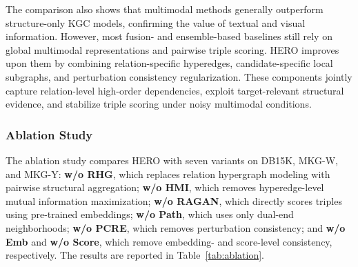 \documentclass[pdflatex,sn-mathphys-num]{sn-jnl}
\begin{document}
The comparison also shows that multimodal methods generally outperform structure-only KGC models, confirming the value of textual and visual information. However, most fusion- and ensemble-based baselines still rely on global multimodal representations and pairwise triple scoring. HERO improves upon them by combining relation-specific hyperedges, candidate-specific local subgraphs, and perturbation consistency regularization. These components jointly capture relation-level high-order dependencies, exploit target-relevant structural evidence, and stabilize triple scoring under noisy multimodal conditions.


\subsubsection{Ablation Study}

The ablation study compares HERO with seven variants on DB15K, MKG-W, and MKG-Y: \textbf{w/o RHG}, which replaces relation hypergraph modeling with pairwise structural aggregation; \textbf{w/o HMI}, which removes hyperedge-level mutual information maximization; \textbf{w/o RAGAN}, which directly scores triples using pre-trained embeddings; \textbf{w/o Path}, which uses only dual-end neighborhoods; \textbf{w/o PCRE}, which removes perturbation consistency; and \textbf{w/o Emb} and \textbf{w/o Score}, which remove embedding- and score-level consistency, respectively. The results are reported in Table~\ref{tab:ablation}.
\end{document}
